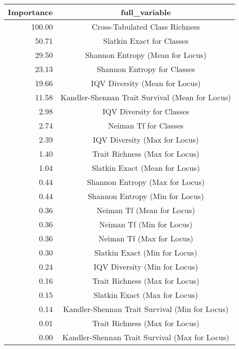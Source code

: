 \begin{tabular}{|r|c|}
  \hline
Importance & full\_variable \\ 
  \hline
100.00 & Cross-Tabulated Class Richness \\ 
  50.71 & Slatkin Exact for Classes \\ 
  29.50 & Shannon Entropy (Mean for Locus) \\ 
  23.13 & Shannon Entropy for Classes \\ 
  19.66 & IQV Diversity (Mean for Locus) \\ 
  11.58 & Kandler-Shennan Trait Survival (Mean for Locus) \\ 
  2.98 & IQV Diversity for Classes \\ 
  2.74 & Neiman Tf for Classes \\ 
  2.39 & IQV Diversity (Max for Locus) \\ 
  1.40 & Trait Richness (Max for Locus) \\ 
  1.04 & Slatkin Exact (Mean for Locus) \\ 
  0.44 & Shannon Entropy (Max for Locus) \\ 
  0.44 & Shannon Entropy (Min for Locus) \\ 
  0.36 & Neiman Tf (Mean for Locus) \\ 
  0.36 & Neiman Tf (Min for Locus) \\ 
  0.36 & Neiman Tf (Max for Locus) \\ 
  0.30 & Slatkin Exact (Min for Locus) \\ 
  0.24 & IQV Diversity (Min for Locus) \\ 
  0.16 & Trait Richness (Max for Locus) \\ 
  0.15 & Slatkin Exact (Max for Locus) \\ 
  0.14 & Kandler-Shennan Trait Survival (Min for Locus) \\ 
  0.01 & Trait Richness (Max for Locus) \\ 
  0.00 & Kandler-Shennan Trait Survival (Max for Locus) \\ 
   \hline
\end{tabular}
